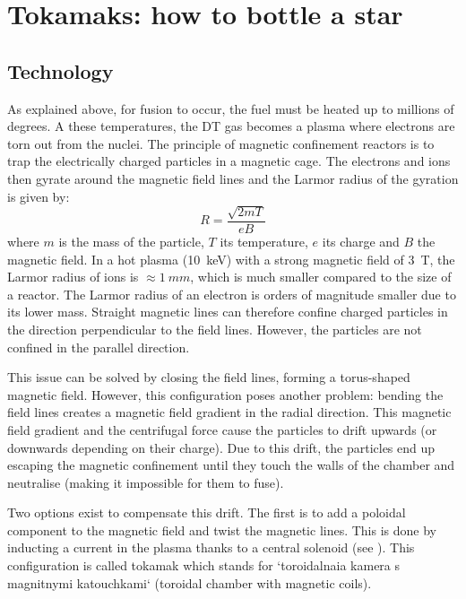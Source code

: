 
\section{Tokamaks: how to bottle a star}

\subsection{Technology \cite{mccracken_fusion_2013}}
As explained above, for fusion to occur, the fuel must be heated up to millions of degrees.
A these temperatures, the DT gas becomes a \gls{plasma} where electrons are torn out from the nuclei.
The principle of magnetic confinement reactors is to trap the electrically charged particles in a magnetic cage.
The electrons and ions then gyrate around the magnetic field lines and the Larmor radius of the gyration is given by:
\begin{equation}
    R =  \frac{\sqrt{2 m T}}{e B}
\end{equation}
where $m$ is the mass of the particle, $T$ its temperature, $e$ its charge and $B$ the magnetic field.
In a hot \gls{plasma} (\SI{10}{keV}) with a strong magnetic field of \SI{3}{T}, the Larmor radius of ions is $\approx \SI{1}{mm}$, which is much smaller compared to the size of a reactor.
The Larmor radius of an electron is orders of magnitude smaller due to its lower mass.
Straight magnetic lines can therefore confine charged particles in the direction perpendicular to the field lines.
However, the particles are not confined in the parallel direction.

This issue can be solved by closing the field lines, forming a torus-shaped magnetic field.
However, this configuration poses another problem: bending the field lines creates a magnetic field gradient in the radial direction.
This magnetic field gradient and the centrifugal force cause the particles to drift upwards (or downwards depending on their charge).
Due to this drift, the particles end up escaping the magnetic confinement until they touch the walls of the chamber and neutralise (making it impossible for them to fuse).

Two options exist to compensate this drift.
The first is to add a poloidal component to the magnetic field and twist the magnetic lines.
This is done by inducting a current in the \gls{plasma} thanks to a central solenoid (see ).
This configuration is called \Gls{tokamak} which stands for `toroidalnaia kamera s magnitnymi katouchkami` (toroidal chamber with magnetic coils).

